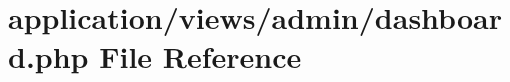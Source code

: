 \hypertarget{views_2admin_2dashboard_8php}{\section{application/views/admin/dashboard.php File Reference}
\label{views_2admin_2dashboard_8php}
}
